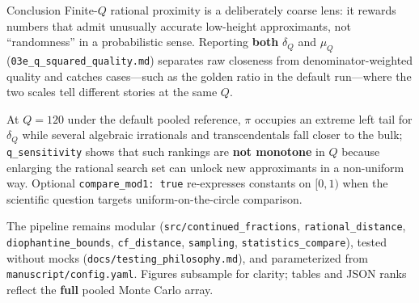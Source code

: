 \documentclass[
  ignorenonframetext,
]{beamer}
\author{\texorpdfstring{}{}}
\date{}
\begin{document}
\begin{frame}[fragile]{Conclusion}
\protect{}\label{conclusion}
Finite-\(Q\) rational proximity is a deliberately coarse lens: it
rewards numbers that admit unusually accurate low-height approximants,
not ``randomness'' in a probabilistic sense. Reporting \textbf{both}
\(\delta_Q\) and \(\mu_Q\) (\texttt{03e\_q\_squared\_quality.md})
separates raw closeness from denominator-weighted quality and catches
cases---such as the golden ratio in the default run---where the two
scales tell different stories at the same \(Q\).

At \(Q=120\) under the default pooled reference, \(\pi\) occupies an
extreme left tail for \(\delta_Q\) while several algebraic irrationals
and transcendentals fall closer to the bulk; \texttt{q\_sensitivity}
shows that such rankings are \textbf{not monotone} in \(Q\) because
enlarging the rational search set can unlock new approximants in a
non-uniform way. Optional \texttt{compare\_mod1:\ true} re-expresses
constants on \([0,1)\) when the scientific question targets
uniform-on-the-circle comparison.

The pipeline remains modular (\texttt{src/continued\_fractions},
\texttt{rational\_distance}, \texttt{diophantine\_bounds},
\texttt{cf\_distance}, \texttt{sampling}, \texttt{statistics\_compare}),
tested without mocks (\texttt{docs/testing\_philosophy.md}), and
parameterized from \texttt{manuscript/config.yaml}. Figures subsample
for clarity; tables and JSON ranks reflect the \textbf{full} pooled
Monte Carlo array.
\end{frame}
\end{document}
